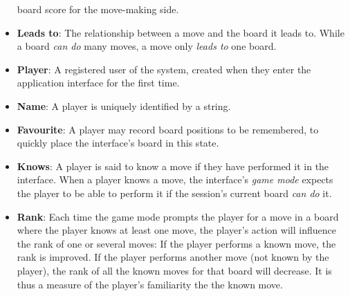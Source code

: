 \documentclass[architecture.tex]{subfiles}
\begin{document}
\begin{itemize}
        board score for the move-making side.
    \item \textbf{Leads to}: The relationship between a move and the board
        it leads to. While a board \textit{can do} many moves, a move
        only \textit{leads to} one board.
    \item \textbf{Player}: A registered user of the system, created
        when they enter the application interface for the first time.
    \item \textbf{Name}: A player is uniquely identified by a string.
    \item \textbf{Favourite}: A player may record board positions
        to be remembered, to quickly place the interface's board in this
        state.
    \item \textbf{Knows}: A player is said to know a move if they have
        performed it in the interface. When a player knows a move,
        the interface's \textit{game mode} expects the player to be able
        to perform it if the session's current board \textit{can do} it.
    \item \textbf{Rank}: Each time the game mode prompts the player for a move
        in a board where the player knows at least one move, the player's action
        will influence the rank of one or several moves:
        If the player performs a known move, the rank is improved.
        If the player performs another move (not known by the player),
        the rank of all the known moves for that board will decrease.
        It is thus a measure of the player's familiarity the the known move.
\end{itemize}
\end{document}
